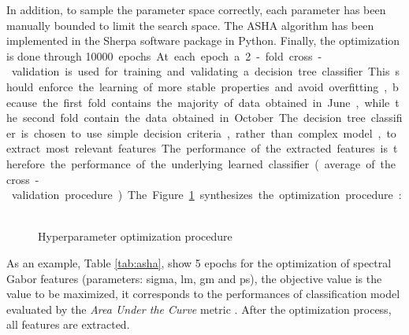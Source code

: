 \documentclass[../thesis.tex]{subfiles}
\begin{document}
    In addition, to sample the parameter space correctly, each parameter has been manually bounded to limit the search space. The ASHA algorithm has been implemented in the Sherpa software package \cite{hertel2020sherpa} in Python. Finally, the optimization is done through \SI{10000} epochs. At each epoch a 2-fold cross-validation is used for training and validating a decision tree classifier. This should enforce the learning of more stable properties and avoid overfitting, because the first fold contains the majority of data obtained in June, while the second fold contain the data obtained in October. The decision tree classifier is chosen to use simple decision criteria, rather than complex model, to extract most relevant features. The performance of the extracted features is therefore the performance of the underlying learned classifier (average of the cross-validation procedure). The Figure \ref{fig:hp-optimization} synthesizes the optimization procedure :
    
    
    \vfill
    \begin{figure}[H]
        \centering
        \vspace{-2em}
        
        \caption{Hyperparameter optimization procedure}
        \label{fig:hp-optimization}
    \end{figure}
    \vfill
    
    
    As an example, Table \ref{tab:asha}, show 5 epochs for the optimization of spectral Gabor features (parameters: sigma, lm, gm and ps), the objective value is the value to be maximized, it corresponds to the performances of classification model evaluated by the \textit{Area Under the Curve} metric \cite{FAWCETT2006861}. %
    After the optimization process, all features are extracted.
    
\end{document}
